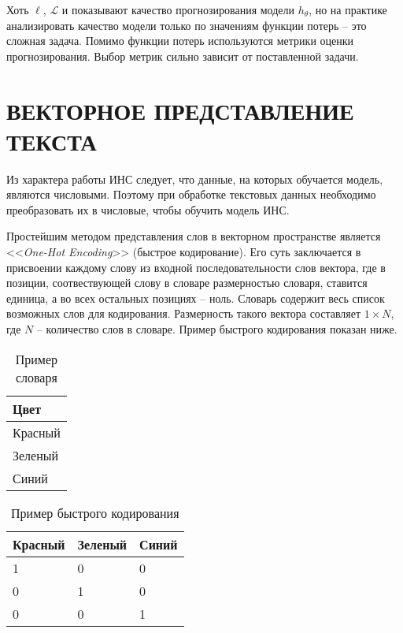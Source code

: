 Хоть $\ell$, $\mathcal{L}$ и показывают качество прогнозирования модели $h_{\theta}$, но на практике анализировать качество модели только по значениям функции потерь -- это сложная задача. Помимо функции потерь используются метрики оценки прогнозирования. Выбор метрик сильно зависит от поставленной задачи.

\section{ВЕКТОРНОЕ ПРЕДСТАВЛЕНИЕ ТЕКСТА}
Из характера работы ИНС следует, что данные, на которых обучается модель, являются числовыми. Поэтому при обработке текстовых данных необходимо преобразовать их в числовые, чтобы обучить модель ИНС.

Простейшим методом представления слов в векторном пространстве является <<\textit{One-Hot Encoding}>> (быстрое кодирование). Его суть заключается в присвоении каждому слову из входной последовательности слов вектора, где в позиции, соотвествующей слову в словаре размерностью словаря, ставится единица, а во всех остальных позициях -- ноль. Словарь содержит весь список возможных слов для кодирования. Размерность такого вектора составляет $1 \times N$, где $N$ -- количество слов в словаре. Пример быстрого кодирования показан ниже.

\begin{table}[H]
    \captionsetup{format=hang, singlelinecheck=false}
    \raggedleft
    \caption{Пример словаря}
    \label{tab:dict}
    \centering
    \begin{tabular}{|p{5cm}|}
        \hline
        \textbf{Цвет} \\
        \hline
        Красный       \\
        \hline
        Зеленый       \\
        \hline
        Синий         \\
        \hline
    \end{tabular}
\end{table}

\begin{table}[H]
    \captionsetup{format=hang, singlelinecheck=false}
    \raggedleft
    \caption{Пример быстрого кодирования}
    \label{tab:ohe}
    \centering
    \begin{tabular}{|p{5cm}|p{5cm}|p{5cm}|}
        \hline
        \textbf{Красный} & \textbf{Зеленый} & \textbf{Синий} \\
        \hline
        1                & 0                & 0              \\
        \hline
        0                & 1                & 0              \\
        \hline
        0                & 0                & 1              \\
        \hline
    \end{tabular}
\end{table}


